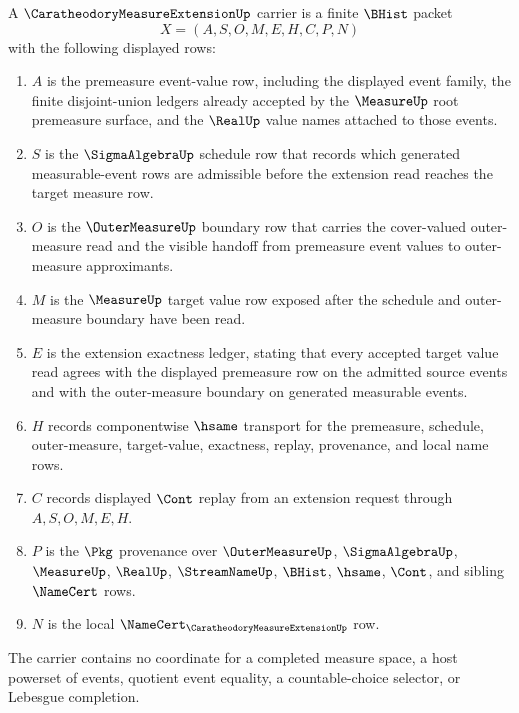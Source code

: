 \begin{definition}
\label{def:caratheodory-measure-extension-carrier}
A $\CaratheodoryMeasureExtensionUp$ carrier is a finite $\BHist$ packet
$$
X=(A,S,O,M,E,H,C,P,N)
$$
with the following displayed rows:
\begin{enumerate}
\item $A$ is the premeasure event-value row, including the displayed event
family, the finite disjoint-union ledgers already accepted by the
$\MeasureUp$ root premeasure surface, and the $\RealUp$ value names attached
to those events.
\item $S$ is the $\SigmaAlgebraUp$ schedule row that records which generated
measurable-event rows are admissible before the extension read reaches the
target measure row.
\item $O$ is the $\OuterMeasureUp$ boundary row that carries the cover-valued
outer-measure read and the visible handoff from premeasure event values to
outer-measure approximants.
\item $M$ is the $\MeasureUp$ target value row exposed after the schedule and
outer-measure boundary have been read.
\item $E$ is the extension exactness ledger, stating that every accepted target
value read agrees with the displayed premeasure row on the admitted source
events and with the outer-measure boundary on generated measurable events.
\item $H$ records componentwise $\hsame$ transport for the premeasure,
schedule, outer-measure, target-value, exactness, replay, provenance, and local
name rows.
\item $C$ records displayed $\Cont$ replay from an extension request through
$A,S,O,M,E,H$.
\item $P$ is the $\Pkg$ provenance over $\OuterMeasureUp$, $\SigmaAlgebraUp$,
$\MeasureUp$, $\RealUp$, $\StreamNameUp$, $\BHist$, $\hsame$, $\Cont$, and
sibling $\NameCert$ rows.
\item $N$ is the local
$\NameCert_{\CaratheodoryMeasureExtensionUp}$ row.
\end{enumerate}
The carrier contains no coordinate for a completed measure space, a host
powerset of events, quotient event equality, a countable-choice selector, or
Lebesgue completion.
\end{definition}

